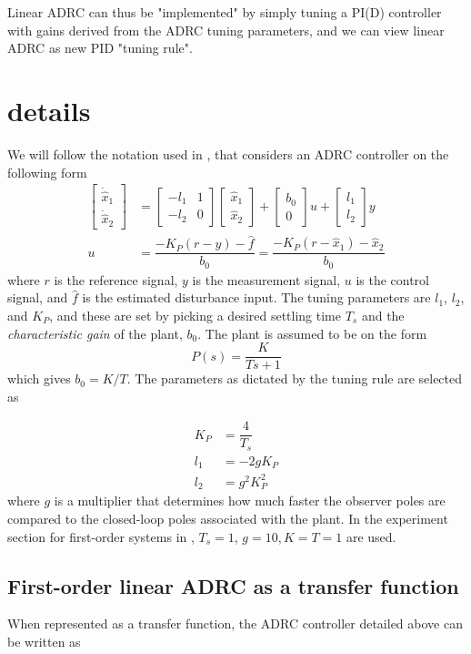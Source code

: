 \documentclass[letterpaper, 10 pt, conference]{ieeeconf}
\newcommand{\bmatrixx}[1]{\begin{bmatrix}#1\end{bmatrix}}
\begin{document}
Linear ADRC can thus be "implemented" by simply tuning a PI(D) controller with gains derived from the ADRC tuning parameters, and we can view linear ADRC as new PID "tuning rule".

\section{details}
We will follow the notation used in \cite{herbst2013simulative}, that considers an ADRC controller on the following form
\begin{align}
   \bmatrixx{\dot{\hat{x}}_1 \\ \dot{\hat{x}}_2} &= 
   		\bmatrixx{-l_1 & 1 \\ -l_2 & 0} \bmatrixx{\hat{x}_1 \\ \hat{x}_2} + 
		\bmatrixx{b_0 \\ 0} u + \bmatrixx{l_1 \\ l_2} y \\
	u &= \dfrac{-K_P(r-y) - \hat{f}}{b_0} = \dfrac{-K_P(r-\hat{x}_1) - \hat{x}_2}{b_0}
\end{align}
where $r$ is the reference signal, $y$ is the measurement signal, $u$ is the control signal, and $\hat{f}$ is the estimated disturbance input. The tuning parameters are $l_1$, $l_2$, and $K_P$, and these are set by picking a desired settling time $T_s$ and the \emph{characteristic gain} of the plant, $b_0$. The plant is assumed to be on the form
$$P(s) = \dfrac{K}{Ts+1}$$
which gives $b_0 = K/T$. The parameters as dictated by the tuning rule are selected as 


\begin{align}
	K_P &= \dfrac{4}{T_s} \\
	l_1 &= -2gK_P \\
	l_2 &= g^2K_P^2
\end{align}
where $g$ is a multiplier that determines how much faster the observer poles are compared to the closed-loop poles associated with the plant. In the experiment section for first-order systems in \cite{herbst2013simulative}, $T_s = 1$, $g = 10, K = T = 1$ are used.

\subsection{First-order linear ADRC as a transfer function}
When represented as a transfer function, the ADRC controller detailed above can be written as
\end{document}
